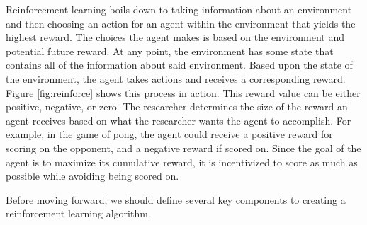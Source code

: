 \documentclass[12pt]{article}
\begin{document}
Reinforcement learning boils down to taking information about an environment and then choosing an action for an agent within the environment that yields the highest reward.  The choices the agent makes is based on the environment and potential future reward. At any point, the environment has some state that contains all of the information about said environment.  Based upon the state of the environment, the agent takes actions and receives a corresponding reward.  Figure \ref{fig:reinforce} shows this process in action. This reward value can be either positive, negative, or zero.  The researcher determines the size of the reward an agent receives based on what the researcher wants the agent to accomplish.  For example, in the game of pong, the agent could receive a positive reward for scoring on the opponent, and a negative reward if scored on.  Since the goal of the agent is to maximize its cumulative reward, it is incentivized to score as much as possible while avoiding being scored on.  

Before moving forward, we should define several key components to creating a reinforcement learning algorithm.  
\end{document}
